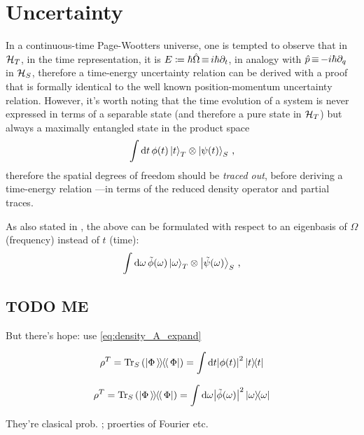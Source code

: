 \section{Uncertainty}

In a continuous-time Page-Wootters universe,
one is tempted to observe that in $\mathcal{H}_T$,
in the time representation, it is $E \coloneqq \hbar\hat{\Omega} \operatorname*{\equiv} i\hbar\partial_{t}$,
in analogy with $\hat{p} \operatorname*{\equiv} -i\hbar\partial_{q}$ in $\mathcal{H}_S$,
therefore a time-energy uncertainty relation can be derived
with a proof that is formally identical to the well known
position-momentum uncertainty relation. However, it's worth
noting that the time evolution of a system is never expressed
in terms of a separable state (and therefore a pure state in $\mathcal{H}_T$)
but always a maximally entangled state in the product space
\begin{equation}
  \int \dd t \, \phi(t) \ket{t}_T \otimes \ket{\psi(t)}_S \, \text{,}
\end{equation}
therefore the spatial degrees of freedom should be \emph{traced out},
before deriving a time-energy relation 
---in terms of the reduced density operator and partial traces.

As also stated in \cite{Lloyd:Time},
the above can be formulated with respect to an eigenbasis of $\Omega$ (frequency)
instead of $t$ (time):
\begin{equation}
  \int \dd \omega \, \tilde{\phi}(\omega) \ket{\omega}_T \otimes \ket{\tilde{\psi}(\omega)}_S \, \text{,}
\end{equation}


\subsection{TODO ME}

But there's hope: use \eqref{eq:density_A_expand}

\[
  \rho^T = \Tr_S\qty(\left| \Phi \left\rangle\hspace{-0.115em}\left\rangle \hspace{-0.115em} \right\langle\hspace{-0.115em}\right\langle \Phi \right|) = \int \dd t \abs{\phi(t)}^2 \ketbra{t}{t} 
\]

\[
  \rho^T = \Tr_S\qty(\left| \Phi \left\rangle\hspace{-0.115em}\left\rangle \hspace{-0.115em} \right\langle\hspace{-0.115em}\right\langle \Phi \right|) = \int \dd \omega \abs{\tilde{\phi}(\omega)}^2 \ketbra{\omega}{\omega} 
\]

They're clasical prob. ; proerties of Fourier etc.